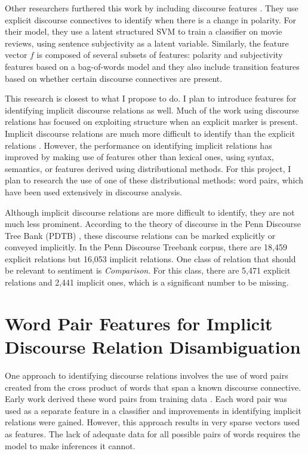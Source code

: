 \documentclass[11pt,letterpaper]{article}
\begin{document}
Other researchers furthered this work by including discourse features \cite{Trivedi}.
They use explicit discourse connectives to identify when there is a change in polarity.
For their model, they use a latent structured SVM to train a classifier on movie reviews, using sentence subjectivity as a latent variable.
Similarly, the feature vector $f$ is composed of several subsets of features: polarity and subjectivity features based on a bag-of-words model and they also include
transition features based on whether certain discourse connectives are present.

This research is closest to what I propose to do.  I plan to introduce features for identifying implicit discourse relations as well.
Much of the work using discourse relations has focused on exploiting structure when an explicit marker is present.  Implicit discourse 
relations are much more difficult to identify than the explicit relations \cite{Pitler:2009b}. However, the performance on identifying implicit 
relations has improved by making use of features other than lexical ones, using syntax, semantics, or features derived using distributional methods.
For this project, I plan to research the use of one of these distributional methods: word pairs, which have been used extensively in discourse analysis.

Although implicit discourse relations are more difficult to identify, they are not much less prominent.  
According to the theory of discourse in the Penn Discourse Tree Bank
(PDTB) \cite{Prasad:2008a}, these discourse
relations can be marked explicitly or conveyed
implicitly. In the Penn Discourse Treebank corpus, there are 18,459 explicit relations but 16,053 implicit relations.  
One class of relation that should be relevant to sentiment is \textit{Comparison}.
For this class, there are 5,471 explicit relations and 2,441 implicit ones, which is a significant number to be missing.

\section{Word Pair Features for Implicit Discourse Relation Disambiguation}

One approach to identifying discourse relations involves the use of word pairs created from the cross product of words that span a known discourse connective.  
Early work derived these word pairs from training data \cite{Marcu:2001}.  Each word pair was used as a separate feature in a classifier and improvements in identifying
implicit relations were gained.  However, this approach results in very sparse vectors used as features.  The lack of adequate data for all possible pairs of words
requires the model to make inferences it cannot.
\end{document}
